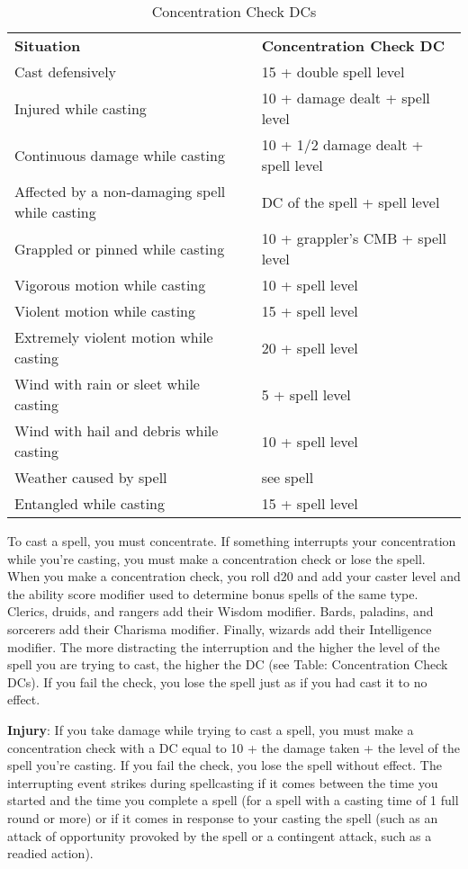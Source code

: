 \begin{table}
 \sffamily
 \caption{Concentration Check DCs}
 \begin{tabular}{ll}
\textbf{Situation} & \textbf{Concentration Check DC}\\
Cast defensively & 15 + double spell level\\
Injured while casting & 10 + damage dealt + spell level\\
Continuous damage while casting & 10 + 1/2 damage dealt + spell level\\
Affected by a non-damaging spell while casting & DC of the spell + spell level\\
Grappled or pinned while casting & 10 + grappler's CMB + spell level\\
Vigorous motion while casting & 10 + spell level\\
Violent motion while casting & 15 + spell level\\
Extremely violent motion while casting & 20 + spell level\\
Wind with rain or sleet while casting & 5 + spell level\\
Wind with hail and debris while casting & 10 + spell level\\
Weather caused by spell & see spell\\
Entangled while casting & 15 + spell level\\
 \end{tabular}

\end{table}


				
To cast a spell, you must concentrate. If something interrupts your concentration while you're casting, you must make a concentration check or lose the spell. When you make a concentration check, you roll d20 and add your caster level and the ability score modifier used to determine bonus spells of the same type. Clerics, druids, and rangers add their Wisdom modifier. Bards, paladins, and sorcerers add their Charisma modifier. Finally, wizards add their Intelligence modifier. The more distracting the interruption and the higher the level of the spell you are trying to cast, the higher the DC (see Table: Concentration Check DCs). If you fail the check, you lose the spell just as if you had cast it to no effect.
				
\textbf{Injury}: If you take damage while trying to cast a spell, you must make a concentration check with a DC equal to 10 + the damage taken + the level of the spell you're casting. If you fail the check, you lose the spell without effect. The interrupting event strikes during spellcasting if it comes between the time you started and the time you complete a spell (for a spell with a casting time of 1 full round or more) or if it comes in response to your casting the spell (such as an attack of opportunity provoked by the spell or a contingent attack, such as a readied action).
				

